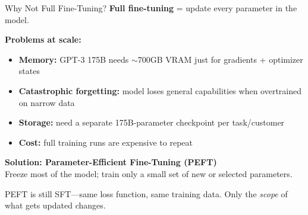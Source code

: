 \documentclass[aspectratio=169]{beamer}
\begin{document}
\begin{frame}{Why Not Full Fine-Tuning?}
  \small
  \textbf{Full fine-tuning} = update every parameter in the model.

  \vspace{6pt}
  \textbf{Problems at scale:}
  \begin{itemize}
    \item \textbf{Memory:} GPT-3 175B needs $\sim$700GB VRAM just for gradients + optimizer states
    \item \textbf{Catastrophic forgetting:} model loses general capabilities when overtrained on narrow data
    \item \textbf{Storage:} need a separate 175B-parameter checkpoint per task/customer
    \item \textbf{Cost:} full training runs are expensive to repeat
  \end{itemize}

  \vspace{8pt}
  \begin{goodbox}
    \textbf{Solution: Parameter-Efficient Fine-Tuning (PEFT)}\\[3pt]
    Freeze most of the model; train only a small set of new or selected parameters.

    \vspace{3pt}
    {\footnotesize\color{NoteGray} PEFT is still SFT---same loss function, same training data. Only the \emph{scope} of what gets updated changes.}
  \end{goodbox}

\end{frame}
\end{document}

